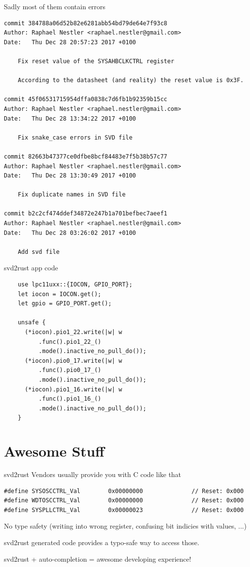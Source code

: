 \documentclass[aspectratio=1610,14pt,t]{beamer}
\begin{document}
\begin{frame}[c,fragile]{Sadly most of them contain errors}
  \begin{verbatim}
commit 384788a06d52b82e6281abb54bd79de64e7f93c8
Author: Raphael Nestler <raphael.nestler@gmail.com>
Date:   Thu Dec 28 20:57:23 2017 +0100

    Fix reset value of the SYSAHBCLKCTRL register

    According to the datasheet (and reality) the reset value is 0x3F.

commit 45f06531715954dffa0838c7d6fb1b92359b15cc
Author: Raphael Nestler <raphael.nestler@gmail.com>
Date:   Thu Dec 28 13:34:22 2017 +0100

    Fix snake_case errors in SVD file

commit 82663b47377ce0dfbe8bcf84483e7f5b38b57c77
Author: Raphael Nestler <raphael.nestler@gmail.com>
Date:   Thu Dec 28 13:30:49 2017 +0100

    Fix duplicate names in SVD file

commit b2c2cf474ddef34872e247b1a701befbec7aeef1
Author: Raphael Nestler <raphael.nestler@gmail.com>
Date:   Thu Dec 28 03:26:02 2017 +0100

    Add svd file
  \end{verbatim}
\end{frame}

\begin{frame}[c,fragile]{svd2rust app code}
  \begin{verbatim}
    use lpc11uxx::{IOCON, GPIO_PORT};
    let iocon = IOCON.get();
    let gpio = GPIO_PORT.get();

    unsafe {
      (*iocon).pio1_22.write(|w| w
          .func().pio1_22_()
          .mode().inactive_no_pull_do());
      (*iocon).pio0_17.write(|w| w
          .func().pio0_17_()
          .mode().inactive_no_pull_do());
      (*iocon).pio1_16.write(|w| w
          .func().pio1_16_()
          .mode().inactive_no_pull_do());
    }
  \end{verbatim}
\end{frame}

\section{Awesome Stuff}

\begin{frame}[c,fragile]{svd2rust}
  Vendors usually provide you with C code like that
  \begin{verbatim}
#define SYSOSCCTRL_Val        0x00000000              // Reset: 0x000
#define WDTOSCCTRL_Val        0x00000000              // Reset: 0x000
#define SYSPLLCTRL_Val        0x00000023              // Reset: 0x000
  \end{verbatim}
  No type safety (writing into wrong register, confusing bit indicies with values, ...)

  svd2rust generated code provides a typo-safe way to access those.

  svd2rust + auto-completion = awesome developing experience!
\end{frame}
\end{document}
